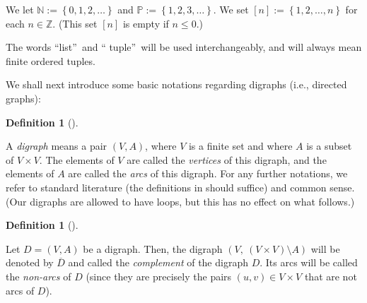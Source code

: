 \documentclass[numbers=enddot,12pt,final,onecolumn,notitlepage]{scrartcl}%
\numberwithin{exer}{section}
\theoremstyle{definition}
\newtheorem{defi}[theo]{Definition}
\newenvironment{definition}[1][]
{\begin{defi}[#1]\begin{leftbar}}
{\end{leftbar}\end{defi}}
\begin{document}
We let $\mathbb{N}:=\left\{  0,1,2,\ldots\right\}  $ and $\mathbb{P}:=\left\{
1,2,3,\ldots\right\}  $. We set $\left[  n\right]  :=\left\{  1,2,\ldots
,n\right\}  $ for each $n\in\mathbb{Z}$. (This set $\left[  n\right]  $ is
empty if $n\leq0$.)

The words \textquotedblleft list\textquotedblright\ and \textquotedblleft
tuple\textquotedblright\ will be used interchangeably, and will always mean
finite ordered tuples.

We shall next introduce some basic notations regarding digraphs (i.e.,
directed graphs):

\begin{definition}
A \emph{digraph} means a pair $\left(  V,A\right)  $, where $V$ is a finite
set and where $A$ is a subset of $V\times V$. The elements of $V$ are called
the \emph{vertices} of this digraph, and the elements of $A$ are called the
\emph{arcs} of this digraph. For any further notations, we refer to standard
literature (the definitions in \cite[\S 1.1-\S 1.2]{17s-lec7} should suffice)
and common sense. (Our digraphs are allowed to have loops, but this has no
effect on what follows.)
\end{definition}

\begin{definition}
Let $D=\left(  V,A\right)  $ be a digraph. Then, the digraph $\left(
V,\ \left(  V\times V\right)  \setminus A\right)  $ will be denoted by
$\overline{D}$ and called the \emph{complement} of the digraph $D$. Its arcs
will be called the \emph{non-arcs} of $D$ (since they are precisely the pairs
$\left(  u,v\right)  \in V\times V$ that are not arcs of $D$).
\end{definition}

\Needspace{18pc}
\end{document}
